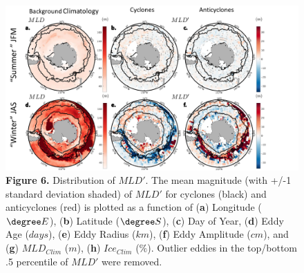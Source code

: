 
\begin{figure}[!htbp]
    \begin{adjustwidth}{-2.2in}{-1.2in}
    \centering
        \includegraphics[scale=.8]{Fig5.pdf}
    \end{adjustwidth}
    \caption[Distribution of $MLD'$.]
    {\textbf{Figure 6.} Distribution of $MLD'$. The mean magnitude (with +/-1 standard deviation shaded) of $MLD'$ for cyclones (black) and anticyclones (red) is plotted as a function of (\textbf{a}) Longitude ($\degree E$), (\textbf{b}) Latitude ($\degree S$), (\textbf{c}) Day of Year, (\textbf{d}) Eddy Age ($days$), (\textbf{e}) Eddy Radius ($km$), (\textbf{f}) Eddy Amplitude ($cm$), and (\textbf{g}) $MLD_{Clim}$ ($m$), (\textbf{h}) $Ice_{Clim}$ ($\%$). Outlier eddies in the top/bottom .5 percentile of $MLD'$ were removed.}
\label{fig:Fig6}
\end{figure}






